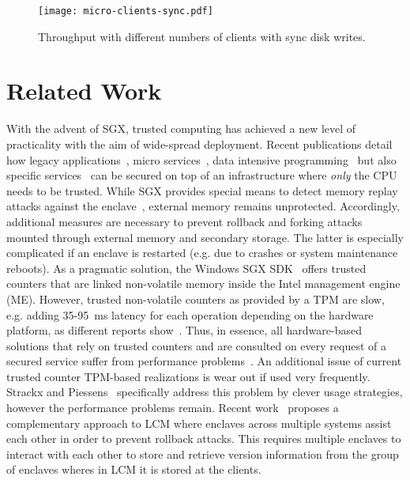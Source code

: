 \documentclass[11pt]{article}
\theoremstyle{plain-boldhead}
\theoremstyle{definition-boldhead}
\newcommand{\pp}{LCM\xspace}
\begin{document}
\begin{figure}[ht]
    \centering
   \texttt{[image: micro-clients-sync.pdf]}
    \caption{Throughput with different numbers of clients with sync disk writes.}
    \label{fig:eval:micro-clients-sync}
\end{figure}


\section{Related Work}\label{sec:related}

With the advent of \ac{SGX}, trusted computing has achieved a new level of 
practicality with the aim of wide-spread deployment.
Recent publications detail how legacy applications~\cite{baumann2014},
micro services~\cite{scone-osdi16}, data intensive programming~\cite{vc3} 
but also specific services~\cite{mw16seckeeper} can be secured on top of an infrastructure where \emph{only} the CPU needs to be trusted.
While \ac{SGX} provides special means to detect memory replay attacks against the enclave~\cite{gueron16}, external memory remains unprotected.
Accordingly, additional measures are necessary to prevent rollback and forking attacks mounted through external memory and secondary storage. 
The latter is especially complicated if an enclave is restarted (e.g. due to crashes or system maintenance reboots).
As a pragmatic solution, the Windows \ac{SGX} SDK~\cite{sgx-sdk-win} offers trusted counters that are linked non-volatile memory inside the Intel management engine (ME).
% 
However, trusted non-volatile counters as provided by a TPM are slow, e.g. adding 35-95~ms latency for each operation  depending on the hardware platform, as different reports show~\cite{strpie16,levin2009,rote}.
Thus, in essence, all hardware-based solutions that rely on trusted counters and are consulted on every request of a secured service suffer from performance problems~\cite{chun2007,levin2009,parno2011}. 
An additional issue of current trusted counter TPM-based realizations is wear out if used very frequently.
Strackx and Piessens~\cite{strpie16} specifically address this problem by clever usage strategies, however the performance problems remain.
% 
Recent work~\cite{rote} proposes a complementary approach to \pp where
enclaves across multiple systems assist each other in order to prevent
rollback attacks.  This requires multiple enclaves to interact with each other
to store and retrieve version information from the group of enclaves wheres in
\pp it is stored at the clients.
\end{document}
